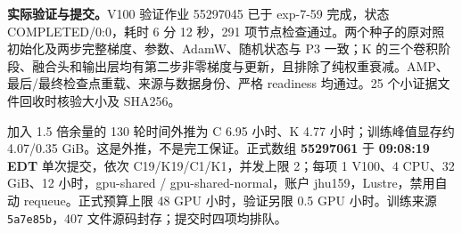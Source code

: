 \par\textbf{实际验证与提交。}V100 验证作业 55297045 已于 exp-7-59 完成，状态 COMPLETED/0:0，耗时 6 分 12 秒，291 项节点检查通过。两个种子的原对照初始化及两步完整梯度、参数、AdamW、随机状态与 P3 一致；K 的三个卷积阶段、融合头和输出层均有第二步非零梯度与更新，且排除了纯权重衰减。AMP、最后/最终检查点重载、来源与数据身份、严格 readiness 均通过。25 个小证据文件回收时核验大小及 SHA256。\par 加入 1.5 倍余量的 130 轮时间外推为 C 6.95 小时、K 4.77 小时；训练峰值显存约 4.07/0.35 GiB。这是外推，不是完工保证。正式数组 \textbf{55297061} 于 \textbf{09:08:19 EDT} 单次提交，依次 C19/K19/C1/K1，并发上限 2；每项 1 V100、4 CPU、32 GiB、12 小时，gpu-shared / gpu-shared-normal，账户 jhu159，Lustre，禁用自动 requeue。正式预算上限 48 GPU 小时，验证另限 0.5 GPU 小时。训练来源 \texttt{5a7e85b}，407 文件源码封存；提交时四项均排队。